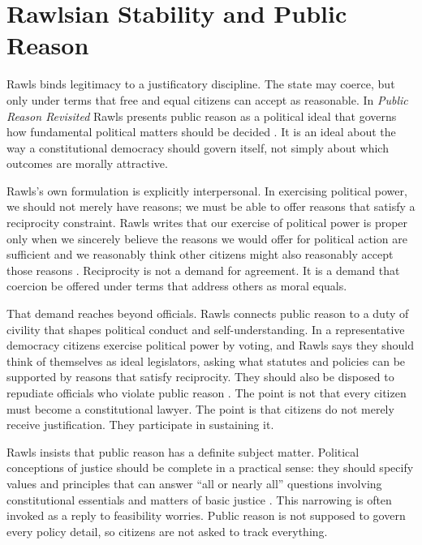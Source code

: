 \documentclass[12pt]{article}
\begin{document}
\section{Rawlsian Stability and Public Reason}

Rawls binds legitimacy to a justificatory discipline. The state may coerce, but only under terms that free and equal citizens can accept as reasonable. In \emph{Public Reason Revisited} Rawls presents public reason as a political ideal that governs how fundamental political matters should be decided \parencite[p.~765]{rawls1997public}. It is an ideal about the way a constitutional democracy should govern itself, not simply about which outcomes are morally attractive.

Rawls's own formulation is explicitly interpersonal. In exercising political power, we should not merely have reasons; we must be able to offer reasons that satisfy a reciprocity constraint. Rawls writes that our exercise of political power is proper only when we sincerely believe the reasons we would offer for political action are sufficient and we reasonably think other citizens might also reasonably accept those reasons \parencite[pp.~446--447]{rawls2005political}. Reciprocity is not a demand for agreement. It is a demand that coercion be offered under terms that address others as moral equals.

That demand reaches beyond officials. Rawls connects public reason to a duty of civility that shapes political conduct and self-understanding. In a representative democracy citizens exercise political power by voting, and Rawls says they should think of themselves as ideal legislators, asking what statutes and policies can be supported by reasons that satisfy reciprocity. They should also be disposed to repudiate officials who violate public reason \parencite[p.~444]{rawls2005political}. The point is not that every citizen must become a constitutional lawyer. The point is that citizens do not merely receive justification. They participate in sustaining it.

Rawls insists that public reason has a definite subject matter. Political conceptions of justice should be complete in a practical sense: they should specify values and principles that can answer \enquote{all or nearly all} questions involving constitutional essentials and matters of basic justice \parencite[pp.~453--454]{rawls2005political}. This narrowing is often invoked as a reply to feasibility worries. Public reason is not supposed to govern every policy detail, so citizens are not asked to track everything.
\end{document}
